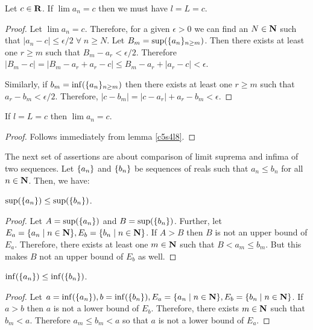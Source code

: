 \begin{lem}\label{c5s4l11}
Let $c \in \mathbf{R}$. If $\lim a_n = c$ then we must have $l = L = c$. 
\end{lem}
\begin{proof}
Let $\lim a_n = c$. Therefore, for a given $\epsilon > 0$ we can find an
$N \in \mathbf{N}$ such that $|a_n - c| \le \epsilon/2 \;\forall\; n \ge N$. Let
$B_m = \sup(\{a_n\}_{n \ge m})$. Then there exists at least one $r \ge m$
such that $B_m - a_r < \epsilon/2$. Therefore $|B_m - c| = |B_m - a_r + a_r
- c| \le B_m - a_r + |a_r - c| < \epsilon$.

Similarly, if $b_m = \inf(\{a_n\}_{n \ge m})$ then there exists at least
one $r \ge m$ such that $a_r - b_m < \epsilon/2$. Therefore, $|c - b_m| =
|c - a_r| + a_r - b_m < \epsilon$.
\end{proof}

\begin{lem}\label{c5s4l12}
If $l = L = c$ then $\lim a_n = c$.
\end{lem}
\begin{proof}
Follows immediately from lemma \ref{c5s4l8}.
\end{proof}

The next set of assertions are about comparison of limit suprema and infima
of two sequences. Let $\{a_n\}$ and $\{b_n\}$ be sequences of reals
such that $a_n \le b_n$ for all $n \in \mathbf{N}$. Then, we have:
\begin{lem}\label{c5s4l13}
$\sup(\{a_n\}) \le \sup(\{b_n\})$.
\end{lem}
\begin{proof}
Let $A = \sup(\{a_n\})$ and $B = \sup(\{b_n\})$. Further, let $E_a = \{
a_n \;|\; n \in \mathbf{N}\}, E_b = \{b_n \;|\; n \in \mathbf{N}\}$. If $A > B$ then $B$
is not an upper bound of $E_a$. Therefore, there exists at least one $m \in
\mathbf{N}$ such that $B < a_m \le b_m$. But this makes $B$ not an upper bound of
$E_b$ as well.
\end{proof}

\begin{lem}\label{c5s4l14}
$\inf(\{a_n\}) \le \inf(\{b_n\})$.
\end{lem}
\begin{proof}
Let $a = \inf(\{a_n\}), b = \inf(\{b_n\}), E_a =\{a_n \;|\; n \in \mathbf{N}\},
E_b = \{b_n \;|\; n \in \mathbf{N}\}$. If $a > b$ then $a$ is not a lower bound
of $E_b$. Therefore, there exists $m \in \mathbf{N}$ such that $b_m < a$. Therefore
$a_m \le b_m < a$ so that $a$ is not a lower bound of $E_a$.
\end{proof}

